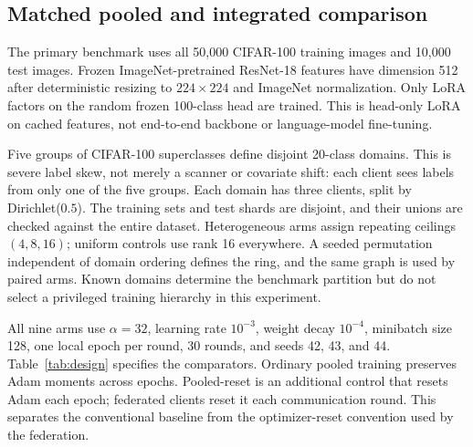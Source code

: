 \documentclass[11pt]{article}
\begin{document}
\subsection{Matched pooled and integrated comparison}
The primary benchmark uses all 50,000 CIFAR-100 training images and 10,000 test images. Frozen ImageNet-pretrained ResNet-18 features have dimension 512 after deterministic resizing to $224\times224$ and ImageNet normalization. Only LoRA factors on the random frozen 100-class head are trained. This is head-only LoRA on cached features, not end-to-end backbone or language-model fine-tuning.

Five groups of CIFAR-100 superclasses define disjoint 20-class domains. This is severe label skew, not merely a scanner or covariate shift: each client sees labels from only one of the five groups. Each domain has three clients, split by Dirichlet($0.5$). The training sets and test shards are disjoint, and their unions are checked against the entire dataset. Heterogeneous arms assign repeating ceilings $(4,8,16)$; uniform controls use rank 16 everywhere. A seeded permutation independent of domain ordering defines the ring, and the same graph is used by paired arms. Known domains determine the benchmark partition but do not select a privileged training hierarchy in this experiment.

All nine arms use $\alpha=32$, learning rate $10^{-3}$, weight decay $10^{-4}$, minibatch size 128, one local epoch per round, 30 rounds, and seeds 42, 43, and 44. Table~\ref{tab:design} specifies the comparators. Ordinary pooled training preserves Adam moments across epochs. Pooled-reset is an additional control that resets Adam each epoch; federated clients reset it each communication round. This separates the conventional baseline from the optimizer-reset convention used by the federation.
\end{document}
